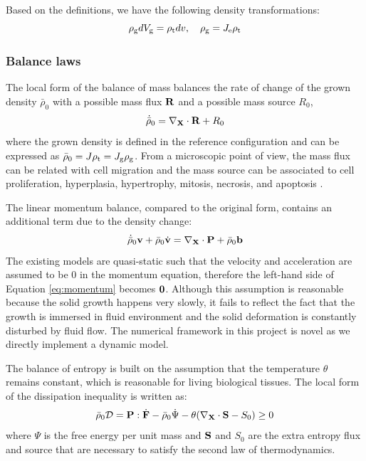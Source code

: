 Based on the definitions, we have the following density transformations:
\begin{equation} \label{eq:mass}
\rho_{\mathrm{g}} dV_{\mathrm{g}} = \rho_{\mathrm{t}} dv, \quad \rho_{\mathrm{g}} = J_{\mathrm{e}}\rho_{\mathrm{t}}
\end{equation}

\subsubsection{Balance laws}
The local form of the balance of mass balances the rate of change of the grown density ${\bar{\rho}}_0$ with 
a possible mass flux $\bold{R}$ and a possible mass source $R_0$,
\begin{equation}
\dot{\bar{\rho}}_0 = \nabla_\bold{X} \cdot \bold{R} + R_0
\end{equation}
where the grown density is defined in the reference configuration and can be expressed as $\bar{\rho}_0 = J\rho_{\mathrm{t}} = J_{\mathrm{g}} \rho_{\mathrm{g}}$. From a microscopic point of view, the mass flux can be related with cell migration and the mass source can be associated to cell proliferation, hyperplasia, hypertrophy, mitosis, necrosis, and apoptosis \cite{Menzel}.

The linear momentum balance, compared to the original form, contains an additional term due to the density change:
\begin{equation} \label{eq:momentum}
\dot{\bar{\rho}}_0 \bold{v} + {\bar{\rho}}_0\dot{\bold{v}} = \nabla_{\bold{X}} \cdot \bold{P} + {\bar{\rho}}_0\bold{b}
\end{equation}
The existing models are quasi-static such that the velocity and acceleration are assumed to be $0$ in the momentum equation, therefore the left-hand side of Equation \ref{eq:momentum} becomes $\bold{0}$. Although this assumption is reasonable because the solid growth happens very slowly, it fails to reflect the fact that the growth is immersed in fluid environment and the solid deformation is constantly disturbed by fluid flow. The numerical framework in this project is novel as we directly implement a dynamic model.

The balance of entropy is built on the assumption that the temperature $\theta$ remains constant, which is reasonable for living biological tissues. The local form of the dissipation inequality is written as:
\begin{equation} \label{eq:entropy}
\bar{\rho}_0 \mathcal{D}= \bold{P} : \dot{\bold{F}} - \bar{\rho}_0 \dot \Psi  - \theta(\nabla_{\bold{X}} \cdot \bold{S} - S_0) \geq 0
\end{equation}
where $\Psi$ is the free energy per unit mass and $\bold{S}$ and $S_0$ are the extra entropy flux and source that are necessary to satisfy the second law of thermodynamics.

